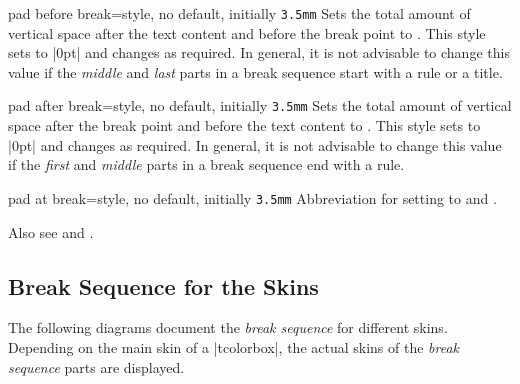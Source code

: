 \begin{docTcbKey}{pad before break}{=}{style, no default, initially \texttt{3.5mm}}
  Sets the total amount of vertical space after the text content and before the
  break point to . This style sets  to |0pt|
  and changes  as required.
  In general, it is not advisable to change this value if the
  \emph{middle} and \emph{last} parts in a break sequence start with a rule or a title.
\end{docTcbKey}

\begin{docTcbKey}{pad after break}{=}{style, no default, initially \texttt{3.5mm}}
  Sets the total amount of vertical space after the break point and before the
  text content to . This style sets  to |0pt|
  and changes  as required.
  In general, it is not advisable to change this value if the
  \emph{first} and \emph{middle} parts in a break sequence end with a rule.
\end{docTcbKey}

\begin{docTcbKey}{pad at break}{=}{style, no default, initially \texttt{3.5mm}}
  Abbreviation for setting  to 
  and .
\end{docTcbKey}


\begin{dispListing}

\begin{tcolorbox}[enhanced jigsaw,breakable,pad at break=0mm,
  title={For this box, the pad space at the break point is set to 0mm}]
  \lipsum[1-2]
\end{tcolorbox}
\end{dispListing}
{\tcbusetemp}


\begin{marker}
Also see 
and .
\end{marker}




\clearpage
\subsection{Break Sequence for the Skins}\label{subsec:breaksequence}
The following diagrams document the \emph{break sequence} for different
skins. Depending on the main skin of a |tcolorbox|, the actual skins of
the \emph{break sequence} parts are displayed.

